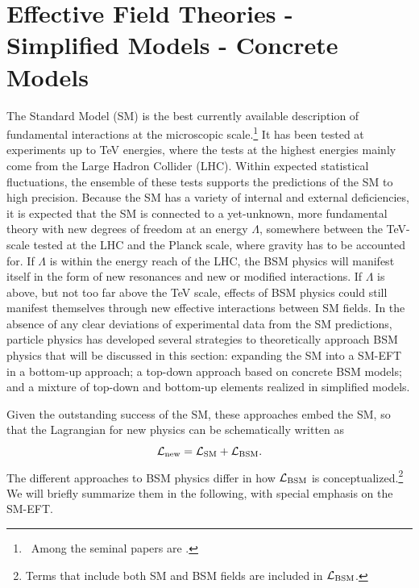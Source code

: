 \section{Effective Field Theories - Simplified Models - Concrete Models}
\label{sec:eftintro}

The Standard Model (SM) is the best currently available description of
fundamental interactions at the microscopic scale.\footnote{~Among the seminal papers are \citep{Weinberg:1967tq,Glashow:1961tr,Salammodel,Fritzsch:1973pi, Higgs:1964ia,Higgs:1964pj,Englert:1964et,Guralnik:1964eu,Hooft:1972fi}.}
It has been tested at experiments up to TeV energies, where the tests at the highest energies mainly come from the Large Hadron Collider (LHC). 
Within expected statistical fluctuations, the ensemble of these tests
supports the predictions of the SM to high precision.
Because the SM has a variety of internal and external deficiencies, it is expected that the SM is connected to a yet-unknown, more fundamental theory with new degrees of freedom at an energy $\Lambda$, somewhere between the TeV-scale tested at the LHC and the Planck scale, where gravity has to be accounted for. 
If $\Lambda$ is within the energy reach of the LHC, the BSM physics
will manifest itself in the form of new resonances and new or modified
interactions. If $\Lambda$ is above, but not too far above the TeV
scale, effects of BSM physics could still manifest themselves through
new effective interactions between SM fields. In the absence of any
clear deviations of experimental data from the SM predictions,
particle physics has developed several strategies to theoretically
approach BSM physics that will be discussed in this section:
expanding the SM into a SM-EFT in a bottom-up approach; a top-down
approach based on concrete BSM models; and a mixture of top-down and
bottom-up elements realized in simplified models.

Given the outstanding success of the SM, these approaches embed the SM, so that the Lagrangian 
for new physics can be schematically written as 
\begin{equation}
{\cal L}_{\rm new} = {\cal L}_{\rm SM} + {\cal L}_{\rm BSM}.
\label{eq:BSM}
\end{equation}
The different approaches to BSM physics differ in how ${\cal L}_{\rm BSM}$ is 
conceptualized.\footnote{Terms that include both SM and BSM fields are included in ${\cal L}_{\rm BSM}$.}
We will briefly summarize them in the following, with special emphasis on the SM-EFT.  


